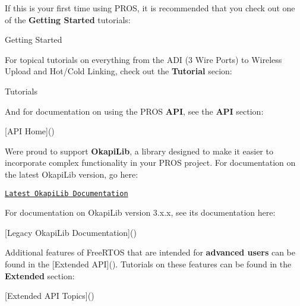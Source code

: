If this is your first time using P\+R\+OS, it is recommended that you check out one of the {\bfseries Getting Started} tutorials\+:

Getting Started

For topical tutorials on everything from the A\+DI (3 Wire Ports) to Wireless Upload and Hot/\+Cold Linking, check out the {\bfseries Tutorial} secion\+:

Tutorials

And for documentation on using the P\+R\+OS {\bfseries A\+PI}, see the {\bfseries A\+PI} section\+:

\mbox{[}A\+PI Home\mbox{]}()

We\textquotesingle{}re proud to support {\bfseries Okapi\+Lib}, a library designed to make it easier to incorporate complex functionality in your P\+R\+OS project. For documentation on the latest Okapi\+Lib version, go here\+:

\href{https://okapilib.github.io/OkapiLib/index.html}{\tt Latest Okapi\+Lib Documentation}

For documentation on Okapi\+Lib version 3.\+x.\+x, see its documentation here\+:

\mbox{[}Legacy Okapi\+Lib Documentation\mbox{]}()

Additional features of Free\+R\+T\+OS that are intended for {\bfseries advanced users} can be found in the \mbox{[}Extended A\+PI\mbox{]}(). Tutorials on these features can be found in the {\bfseries Extended} section\+:

\mbox{[}Extended A\+PI Topics\mbox{]}() 